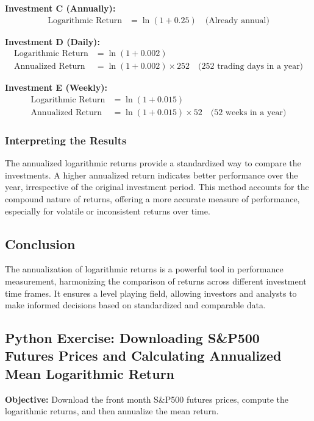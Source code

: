 \documentclass{article}
\begin{document}
\textbf{Investment C (Annually):}
\begin{align*}
    \text{Logarithmic Return} &= \ln(1 + 0.25) \quad \text{(Already annual)}
\end{align*}

\textbf{Investment D (Daily):}
\begin{align*}
    \text{Logarithmic Return} &= \ln(1 + 0.002) \\
    \text{Annualized Return} &= \ln(1 + 0.002) \times 252 \quad \text{(252 trading days in a year)}
\end{align*}

\textbf{Investment E (Weekly):}
\begin{align*}
    \text{Logarithmic Return} &= \ln(1 + 0.015) \\
    \text{Annualized Return} &= \ln(1 + 0.015) \times 52 \quad \text{(52 weeks in a year)}
\end{align*}

\subsubsection*{Interpreting the Results}

The annualized logarithmic returns provide a standardized way to compare the investments. A higher annualized return indicates better performance over the year, irrespective of the original investment period. This method accounts for the compound nature of returns, offering a more accurate measure of performance, especially for volatile or inconsistent returns over time.

\subsection{Conclusion}

The annualization of logarithmic returns is a powerful tool in performance measurement, harmonizing the comparison of returns across different investment time frames. It ensures a level playing field, allowing investors and analysts to make informed decisions based on standardized and comparable data.

\subsection{Python Exercise: Downloading S\&P500 Futures Prices and Calculating Annualized Mean Logarithmic Return}

\textbf{Objective:} Download the front month S\&P500 futures prices, compute the logarithmic returns, and then annualize the mean return. \\
\end{document}
